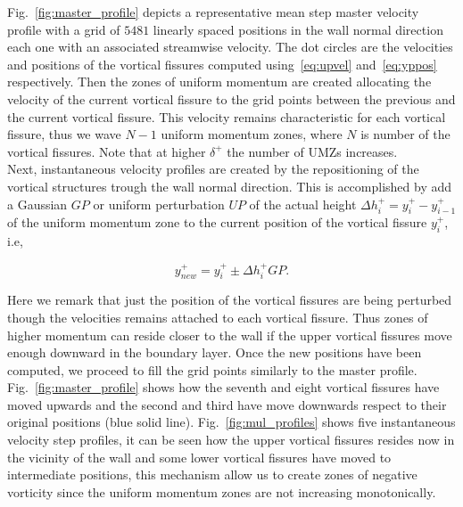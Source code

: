 \documentclass[aps,reprint,amsmath,amssymb,pra,floatfix]{revtex4-1}%
\begin{document}
Fig.~\ref{fig:master_profile} depicts a representative mean step master velocity profile with a grid of $5481$ linearly spaced positions in the wall normal direction each one with an associated streamwise velocity. The dot circles are the velocities and positions of the vortical fissures computed using~\eqref{eq:upvel} and~\eqref{eq:yppos} respectively. Then the zones of uniform momentum are created allocating the velocity of the current vortical fissure to the grid points between the previous and the current vortical fissure. This velocity remains characteristic for each vortical fissure, thus we wave $N-1$ uniform momentum zones, where $N$ is number of the vortical fissures. Note that at higher $\delta^+$ the number of UMZs increases.\\
Next, instantaneous velocity profiles are created by the repositioning of the vortical structures trough the wall normal direction. This is accomplished by add a Gaussian $GP$ or uniform perturbation $UP$ of the actual height $\Delta h^+_i=y^+_i-y^+_{i-1}$ of the uniform momentum zone to the current position of the vortical fissure $y^+_i$, i.e, 

\begin{equation}\label{eq:ypert}
y^+_{new}=y^+_i\pm \Delta h^+_i GP.
\end{equation}

Here we remark that just the position of the vortical fissures are being perturbed though the velocities remains attached to each vortical fissure. Thus zones of higher momentum can reside closer to the wall if the upper vortical fissures move enough downward in the boundary layer. Once the new positions have been computed, we proceed to fill the grid points similarly to the master profile. Fig.~\ref{fig:master_profile} shows how the seventh and eight vortical fissures have moved upwards and the second and third have move downwards respect to their original positions (blue solid line).  Fig.~\ref{fig:mul_profiles} shows five instantaneous velocity step profiles,  it can be seen how the upper vortical fissures resides now in the vicinity of the wall and some lower vortical fissures have moved to intermediate positions, this mechanism allow us to create zones of negative vorticity since the  uniform momentum zones are not increasing monotonically. 
\end{document}
